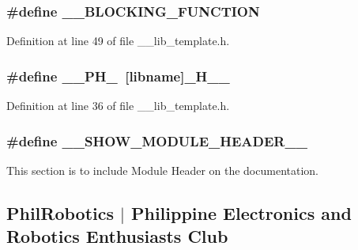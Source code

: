 \subsubsection[{\-\_\-\-\_\-\-B\-L\-O\-C\-K\-I\-N\-G\-\_\-\-F\-U\-N\-C\-T\-I\-O\-N}]{\setlength{\rightskip}{0pt plus 5cm}\#define \-\_\-\-\_\-\-B\-L\-O\-C\-K\-I\-N\-G\-\_\-\-F\-U\-N\-C\-T\-I\-O\-N}\label{____lib__template_8h_a5e71ff5923bf14eb62355703edcc90c2}


Definition at line 49 of file \-\_\-\-\_\-lib\-\_\-template.\-h.

\subsubsection[{\-\_\-\-\_\-\-P\-H\-\_\-}]{\setlength{\rightskip}{0pt plus 5cm}\#define \-\_\-\-\_\-\-P\-H\-\_\-~[libname]\-\_\-\-H\-\_\-\-\_\-}\label{____lib__template_8h_a5558e4961c902c9d89a041dadd84d43e}


Definition at line 36 of file \-\_\-\-\_\-lib\-\_\-template.\-h.

\subsubsection[{\-\_\-\-\_\-\-S\-H\-O\-W\-\_\-\-M\-O\-D\-U\-L\-E\-\_\-\-H\-E\-A\-D\-E\-R\-\_\-\-\_\-}]{\setlength{\rightskip}{0pt plus 5cm}\#define \-\_\-\-\_\-\-S\-H\-O\-W\-\_\-\-M\-O\-D\-U\-L\-E\-\_\-\-H\-E\-A\-D\-E\-R\-\_\-\-\_\-}\label{____lib__template_8h_aa61948e995c04179b19d5e2ad6f5ac9f}


This section is to include Module Header on the documentation. 

\subsection*{Phil\-Robotics $|$ Philippine Electronics and Robotics Enthusiasts Club}

